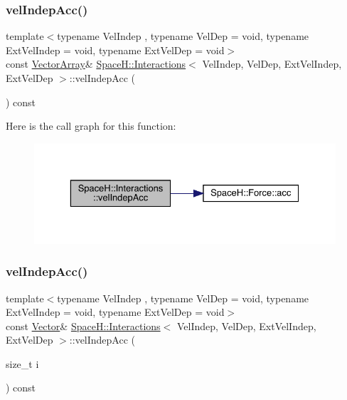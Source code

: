 \subsubsection{\texorpdfstring{vel\+Indep\+Acc()}{velIndepAcc()}\hspace{0.1cm}{\footnotesize\ttfamily [1/2]}}
{\footnotesize\ttfamily template$<$typename Vel\+Indep , typename Vel\+Dep  = void, typename Ext\+Vel\+Indep  = void, typename Ext\+Vel\+Dep  = void$>$ \\
const \mbox{\hyperlink{class_space_h_1_1_interactions_ac9d9b24b469c4be73b96ce0f09f93fcf}{Vector\+Array}}\& \mbox{\hyperlink{class_space_h_1_1_interactions}{Space\+H\+::\+Interactions}}$<$ Vel\+Indep, Vel\+Dep, Ext\+Vel\+Indep, Ext\+Vel\+Dep $>$\+::vel\+Indep\+Acc (\begin{DoxyParamCaption}{ }\end{DoxyParamCaption}) const\hspace{0.3cm}{\ttfamily [inline]}}

Here is the call graph for this function\+:
\nopagebreak
\begin{figure}[H]
\begin{center}
\leavevmode
\includegraphics[width=329pt]{class_space_h_1_1_interactions_af9568e6cb38cfa30480c2d267f5cc442_cgraph}
\end{center}
\end{figure}
\mbox{\label{class_space_h_1_1_interactions_a5293a4d03004f7f454e3e1c7e7d04310}} 
\subsubsection{\texorpdfstring{vel\+Indep\+Acc()}{velIndepAcc()}\hspace{0.1cm}{\footnotesize\ttfamily [2/2]}}
{\footnotesize\ttfamily template$<$typename Vel\+Indep , typename Vel\+Dep  = void, typename Ext\+Vel\+Indep  = void, typename Ext\+Vel\+Dep  = void$>$ \\
const \mbox{\hyperlink{class_space_h_1_1_interactions_aaebe228fb44635e85cdb8cc9c10d30d1}{Vector}}\& \mbox{\hyperlink{class_space_h_1_1_interactions}{Space\+H\+::\+Interactions}}$<$ Vel\+Indep, Vel\+Dep, Ext\+Vel\+Indep, Ext\+Vel\+Dep $>$\+::vel\+Indep\+Acc (\begin{DoxyParamCaption}\item[{size\+\_\+t}]{i }\end{DoxyParamCaption}) const\hspace{0.3cm}{\ttfamily [inline]}}

